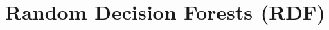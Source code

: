\documentclass[numbered,pdftex]{ohio-etd}
\begin{document}
{%
%		
%		
%	
%		
%		
%		
%		
%		
%		
	
	\section{Random Decision Forests (RDF)}\label{RDF_SECT}{
		
}}
\end{document}

